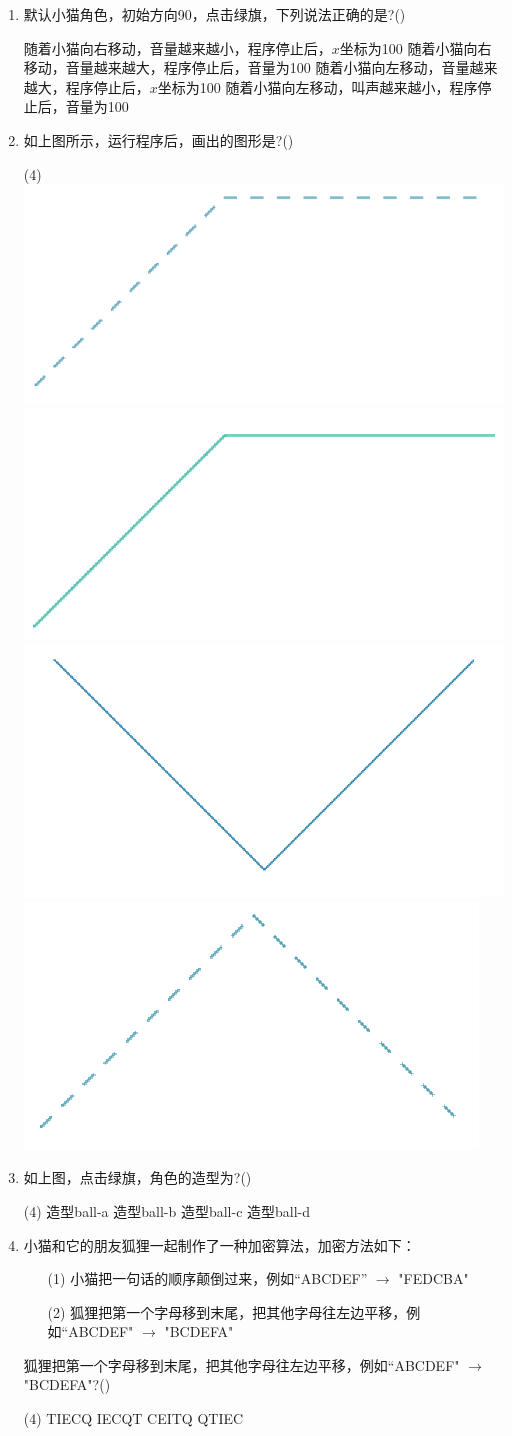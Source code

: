 \documentclass[10pt, a4paper]{article}
\begin{document}
\begin{enumerate}
        \item 默认小猫角色，初始方向90，点击绿旗，下列说法正确的是?(\qquad)
        \begin{tasks}
            \task 随着小猫向右移动，音量越来越小，程序停止后，$x$坐标为100
            \task 随着小猫向右移动，音量越来越大，程序停止后，音量为100
            \task 随着小猫向左移动，音量越来越大，程序停止后，$x$坐标为100
            \task 随着小猫向左移动，叫声越来越小，程序停止后，音量为100
        \end{tasks}

        \item 如上图所示，运行程序后，画出的图形是?(\qquad)
        \begin{tasks}(4)
            \task \includegraphics[width=.1\textwidth]{22a.png}
            \task \includegraphics[width=.1\textwidth]{22b.png}
            \task \includegraphics[width=.1\textwidth]{22c.png}
            \task \includegraphics[width=.1\textwidth]{22d.png}
        \end{tasks}

        \item 如上图，点击绿旗，角色的造型为?(\qquad)
        \begin{tasks}(4)
            \task 造型ball-a
            \task 造型ball-b
            \task 造型ball-c
            \task 造型ball-d
        \end{tasks}

        \item 小猫和它的朋友狐狸一起制作了一种加密算法，加密方法如下：
        \begin{enumerate}
            \item[(1)] 小猫把一句话的顺序颠倒过来，例如“ABCDEF” $\to$ "FEDCBA"
            \item[(2)] 狐狸把第一个字母移到末尾，把其他字母往左边平移，例如“ABCDEF" $\to$ "BCDEFA"
        \end{enumerate}
        狐狸把第一个字母移到末尾，把其他字母往左边平移，例如“ABCDEF" $\to$ "BCDEFA"?(\qquad)
        \begin{tasks}(4)
            \task TIECQ
            \task IECQT
            \task CEITQ
            \task QTIEC
        \end{tasks}


\end{enumerate}
\end{document}
